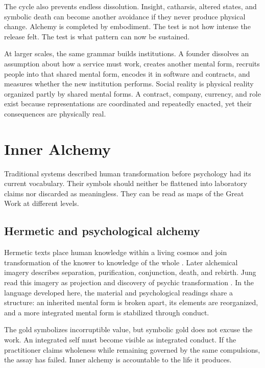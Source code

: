 \documentclass[11pt]{article}
\theoremstyle{plain}
\theoremstyle{definition}
\begin{document}
The cycle also prevents endless dissolution. Insight, catharsis, altered states, and
symbolic death can become another avoidance if they never produce physical change.
Alchemy is completed by embodiment. The test is not how intense the release felt. The
test is what pattern can now be sustained.

At larger scales, the same grammar builds institutions. A founder dissolves an
assumption about how a service must work, creates another mental form, recruits people
into that shared mental form, encodes it in software and contracts, and measures
whether the new institution performs. Social reality is physical reality organized
partly by shared mental forms. A contract, company, currency, and role exist because
representations are coordinated and repeatedly enacted, yet their consequences are
physically real.

\section{Inner Alchemy}

Traditional systems described human transformation before psychology had its current
vocabulary. Their symbols should neither be flattened into laboratory claims nor
discarded as meaningless. They can be read as maps of the Great Work at different
levels.

\subsection*{Hermetic and psychological alchemy}

Hermetic texts place human knowledge within a living cosmos and join transformation of
the knower to knowledge of the whole \citep{copenhaver1992hermetica}. Later alchemical
imagery describes separation, purification, conjunction, death, and rebirth. Jung read
this imagery as projection and discovery of psychic transformation
\citep{jung1968alchemy}. In the language developed here, the material and psychological
readings share a structure: an inherited mental form is broken apart, its elements are
reorganized, and a more integrated mental form is stabilized through conduct.

The gold symbolizes incorruptible value, but symbolic gold does not excuse the work.
An integrated self must become visible as integrated conduct. If the practitioner
claims wholeness while remaining governed by the same compulsions, the assay has
failed. Inner alchemy is accountable to the life it produces.
\end{document}

